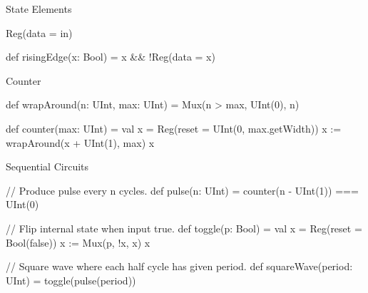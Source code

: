 \documentclass[xcolor=pdflatex,dvipsnames,table]{beamer}
\begin{document}
% 
% 

\begin{frame}[fragile]{State Elements}

\begin{scala}
Reg(data = in)
\end{scala}

\begin{scala}
def risingEdge(x: Bool) = x && !Reg(data = x)
\end{scala}

\end{frame}

\begin{frame}[fragile]{Counter}

\begin{scala}
def wrapAround(n: UInt, max: UInt) =
  Mux(n > max, UInt(0), n)

def counter(max: UInt) = {
  val x = Reg(reset = UInt(0, max.getWidth))
  x := wrapAround(x + UInt(1), max)
  x
}
\end{scala}

\end{frame}

\begin{frame}[fragile]{Sequential Circuits}

\begin{scala}
// Produce pulse every n cycles.
def pulse(n: UInt) = counter(n - UInt(1)) === UInt(0)
\end{scala}

\begin{scala}
// Flip internal state when input true.
def toggle(p: Bool) = {
  val x = Reg(reset = Bool(false))
  x := Mux(p, !x, x)
  x
}
\end{scala}

\begin{scala}
// Square wave where each half cycle has given period.
def squareWave(period: UInt) = toggle(pulse(period))
\end{scala}

\end{frame}
\end{document}
